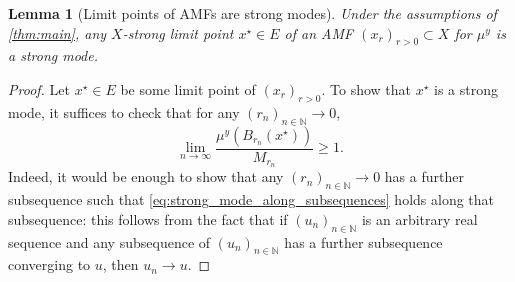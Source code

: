 \documentclass[11pt]{article}
\newcommand*{\cball}[2]{B_{#2}(#1)}
\newcommand*{\Naturals}{\mathbb{N}}
\renewcommand*{\geq}{\geqslant}
\theoremstyle{plain}
\newtheorem{lemma}[theorem]{Lemma}
\theoremstyle{definition}
\numberwithin{equation}{section}
\numberwithin{figure}{section}
\numberwithin{table}{section}
\begin{document}
\begin{lemma}[Limit points of AMFs are strong modes]
	\label{lem:AMF_limit_point_is_strong}
	Under the assumptions of \cref{thm:main}, any $X$-strong limit point $x^{\star} \in E$ of an AMF $(x_r)_{r > 0} \subset X$ for $\mu^y$ is a strong mode.
\end{lemma}

\begin{proof}
	Let $x^{\star} \in E$ be some limit point of $(x_{r})_{r > 0}$. 
	To show that $x^{\star}$ is a strong mode, it suffices to check that for any $(r_{n})_{n \in \Naturals} \to 0$,
	\begin{equation} \label{eq:strong_mode_along_subsequences}
		\lim_{n \to \infty} \frac{\mu^{y}(\cball{x^{\star}}{r_{n}})}{M_{r_{n}}} \geq 1.
	\end{equation}
	Indeed, it would be enough to show that any $(r_{n})_{n \in \Naturals} \to 0$ has a further subsequence such that \eqref{eq:strong_mode_along_subsequences} holds along that subsequence:
	this follows from the fact that if $(u_n)_{n \in \Naturals}$ is an arbitrary real sequence and any subsequence of $(u_n)_{n \in \Naturals}$ has a further subsequence converging to $u$, then $u_n \to u$.


\end{proof}
\end{document}
